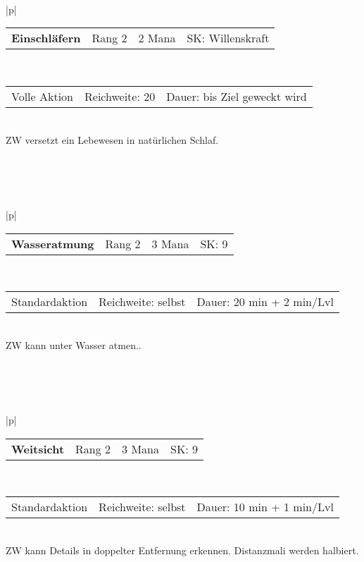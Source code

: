 \documentclass[../../Heldenanleitung2]{subfiles}
\begin{document}
\\\\\\
\begin{tabular}{|p{\textwidth}|}
\hline
\begin{tabularx}{\textwidth}{X|X|X|X}
\textbf{Einschläfern} & Rang 2 & 2 Mana & SK: Willenskraft
\end{tabularx} \\ \hline
\begin{tabularx}{\textwidth}{X|X|X}
Volle Aktion & Reichweite: 20 & Dauer: bis Ziel geweckt wird
\end{tabularx} \\ \hline
ZW versetzt ein Lebewesen in natürlichen Schlaf. 
\\ \hline
\end{tabular}
\\\\\\
\begin{tabular}{|p{\textwidth}|}
\hline
\begin{tabularx}{\textwidth}{X|X|X|X}
\textbf{Wasseratmung} & Rang 2 & 3 Mana & SK: 9
\end{tabularx} \\ \hline
\begin{tabularx}{\textwidth}{X|X|X}
Standardaktion & Reichweite: selbst & Dauer: 20 min + 2 min/Lvl
\end{tabularx} \\ \hline
ZW kann unter Wasser atmen.. 
\\ \hline
\end{tabular}
\\\\\\
\begin{tabular}{|p{\textwidth}|}
\hline
\begin{tabularx}{\textwidth}{X|X|X|X}
\textbf{Weitsicht} & Rang 2 & 3 Mana & SK: 9
\end{tabularx} \\ \hline
\begin{tabularx}{\textwidth}{X|X|X}
Standardaktion & Reichweite: selbst & Dauer: 10 min + 1 min/Lvl
\end{tabularx} \\ \hline
ZW kann Details in doppelter Entfernung erkennen. Distanzmali werden halbiert.
\\ \hline
\end{tabular}
\\\\\\
\end{document}
